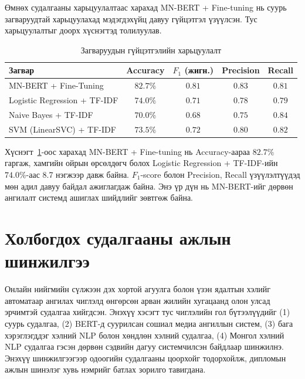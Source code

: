 Өмнөх судалгааны харьцуулалтаас \cite{jargalmaa2025} харахад MN-BERT +
Fine-tuning нь суурь загваруудтай харьцуулахад мэдэгдэхүйц давуу гүйцэтгэл
үзүүлсэн. Тус харьцуулалтыг доорх хүснэгтэд толилуулав.

\begin{table}[ht]
  \centering
  \caption{Загваруудын гүйцэтгэлийн харьцуулалт \cite{jargalmaa2025}}
  \label{tab:model-comparison}
  \begin{tabular}{lcccc}
    \toprule
    \textbf{Загвар} & \textbf{Accuracy} & \textbf{$F_1$ (жигн.)} &
    \textbf{Precision} & \textbf{Recall} \\
    \midrule
    MN-BERT + Fine-Tuning          & $82.7\%$ & $0.81$ & $0.83$ & $0.81$ \\
    Logistic Regression + TF-IDF   & $74.0\%$ & $0.71$ & $0.78$ & $0.79$ \\
    Naive Bayes + TF-IDF           & $70.0\%$ & $0.68$ & $0.75$ & $0.84$ \\
    SVM (LinearSVC) + TF-IDF      & $73.5\%$ & $0.72$ & $0.80$ & $0.82$ \\
    \bottomrule
  \end{tabular}
\end{table}

Хүснэгт~\ref{tab:model-comparison}-оос харахад MN-BERT + Fine-tuning нь
Accuracy-аараа $82.7\%$ гаргаж, хамгийн ойрын өрсөлдөгч болох Logistic
Regression + TF-IDF-ийн $74.0\%$-аас 8.7 нэгжээр давж байна. $F_1$-score болон
Precision, Recall үзүүлэлтүүдэд мөн адил давуу байдал ажиглагдаж байна. Энэ үр
дүн нь MN-BERT-ийг дөрвөн ангилалт системд ашиглах шийдлийг зөвтгөж байна.


\section{Холбогдох судалгааны ажлын шинжилгээ}
\label{sec:related-work}

Онлайн нийгмийн сүлжээн дэх хортой агуулга болон үзэн ядалтын хэлийг
автоматаар ангилах чиглэлд өнгөрсөн арван жилийн хугацаанд олон улсад эрчимтэй
судалгаа хийгдсэн. Энэхүү хэсэгт тус чиглэлийн гол бүтээлүүдийг (1) суурь
судалгаа, (2) BERT-д суурилсан сошиал медиа ангиллын систем, (3) бага
хэрэглэгддэг хэлний NLP болон хөндлөн хэлний судалгаа, (4) Монгол хэлний NLP
судалгаа гэсэн дөрвөн сэдвийн дагуу системчилсэн байдлаар шинжилнэ. Энэхүү
шинжилгээгээр одоогийн судалгааны цоорхойг тодорхойлж, дипломын ажлын шинэлэг
хувь нэмрийг батлах зорилго тавигдана.

